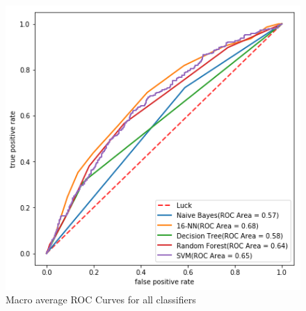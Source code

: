 %
\label{cha:prospect}
\begin{figure}[h]
	\includegraphics[width=\textwidth]{images/roc.png}
	\caption{Macro average ROC Curves for all classifiers}
	\label{img:roc}
\end{figure}
\FloatBarrier